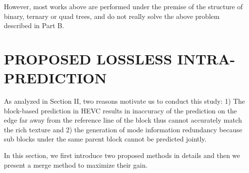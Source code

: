 \documentclass[journal]{IEEEtran}
\begin{document}
However, most works above are performed under the premise of the structure of binary, ternary or quad trees, and do not really solve the above problem described in Part B.


\section{PROPOSED LOSSLESS INTRA-PREDICTION}
As analyzed in Section II, two reasons motivate us to conduct this study: 1) The block-based prediction in HEVC results in inaccuracy of the prediction on the edge far away from the reference line of the block thus cannot accurately match the rich texture and 2) the generation of mode information redundancy because sub blocks under the same parent block cannot be predicted jointly.

In this section, we first introduce two proposed methods in details and then we present a merge method to maximize their gain.
\end{document}
